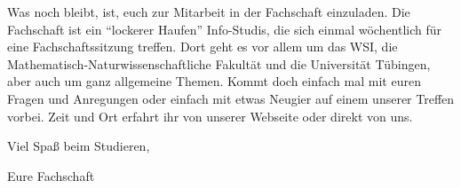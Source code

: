 Was noch bleibt, ist, euch zur Mitarbeit in der Fachschaft einzuladen.  Die
Fachschaft ist ein "`lockerer Haufen"' Info-Studis, die sich einmal wöchentlich
für eine Fachschaftssitzung treffen. Dort geht es vor allem um das WSI, die 
Mathematisch-Naturwissenschaftliche Fakultät und die Universität Tübingen, 
aber auch um ganz allgemeine Themen. Kommt doch einfach mal mit euren Fragen 
und Anregungen oder einfach mit etwas Neugier auf einem unserer Treffen vorbei.  
Zeit und Ort erfahrt ihr von unserer Webseite oder direkt von uns.

\bigskip

Viel Spaß beim Studieren,

Eure Fachschaft
\vfill
\bigskip

\eject

